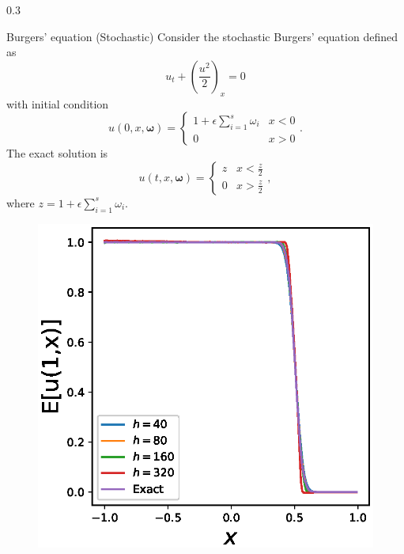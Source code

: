 \documentclass{msuposter}
\newcommand{\colwidth}{0.3\linewidth}
\begin{document}
\begin{frame}{}
\begin{columns}[t]
\begin{column}{\colwidth}
\begin{exampleblock}{Burgers' equation (Stochastic)}
\large
Consider the stochastic Burgers' equation defined as
 \begin{equation}\label{eqn:bur stochastic}
 	u_t + (\frac{u^2}{2})_x = 0
 \end{equation} 
 with initial condition 
 \begin{equation}\label{eqn:bur stochastic ic}
 	u(0,x,\boldsymbol{\omega}) = \left\{
 	\begin{matrix}
 		1+\epsilon \sum_{i=1}^s \omega_i & x<0 \\
 		 0 & x>0 
 	\end{matrix}
 	\right..
 \end{equation}
The exact solution is
\begin{equation}
	 	u(t,x,\boldsymbol{\omega}) = \left\{
 	\begin{matrix}
 		z  & x< \frac{z}{2}\\
 		 0 & x>\frac{z}{2}
 	\end{matrix}
 	\right.,
\end{equation}
where $z = 1+\epsilon \sum_{i=1}^s \omega_i$. 
\begin{figure}
\includegraphics[width = 0.8\linewidth]{Burgus_equation_storchstic_dim_s_10_eps_005_E}

\end{figure}
\end{exampleblock}
\end{column}
\end{columns}
\end{frame}
\end{document}
